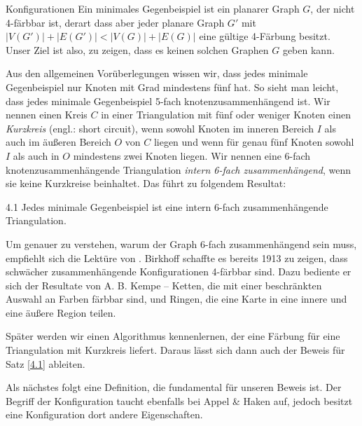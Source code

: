 \begin{section}{Konfigurationen}
 Ein minimales Gegenbeispiel ist ein planarer Graph $G$, der nicht 4-färbbar ist, derart dass aber jeder planare Graph $G'$ mit $|V(G')| + |E(G')| < |V(G)| + |E(G)|$ eine gültige 4-Färbung besitzt. Unser Ziel ist also, zu zeigen, dass es keinen solchen Graphen $G$ geben kann. 
   
 Aus den allgemeinen Vorüberlegungen wissen wir, dass jedes minimale Gegenbeispiel nur Knoten mit Grad mindestens fünf hat. So sieht man leicht, dass jedes minimale Gegenbeispiel 5-fach knotenzusammenhängend ist. Wir nennen einen Kreis $C$ in einer Triangulation mit fünf oder weniger Knoten einen \textit{Kurzkreis} (engl.: short circuit), wenn sowohl Knoten im inneren Bereich $I$ als auch im äußeren Bereich $O$ von $C$ liegen und wenn für genau fünf Knoten sowohl $I$ als auch in $O$ mindestens zwei Knoten liegen. Wir nennen eine 6-fach knotenzusammenhängende Triangulation \textit{intern 6-fach zusammenhängend}, wenn sie keine Kurzkreise beinhaltet. Das führt zu folgendem Resultat:
  
 \begin{satzl}{}{4.1}
  Jedes minimale Gegenbeispiel ist eine intern 6-fach zusammenhängende Triangulation. 
 \end{satzl}

 Um genauer zu verstehen, warum der Graph 6-fach zusammenhängend sein muss, empfiehlt sich die Lektüre von \cite{AmJMath35}. Birkhoff schaffte es bereits 1913 zu zeigen, dass schwächer zusammenhängende Konfigurationen 4-färbbar sind. Dazu bediente er sich der Resultate von A. B. Kempe -- Ketten, die mit einer beschränkten Auswahl an Farben färbbar sind, und Ringen, die eine Karte in eine innere und eine äußere Region teilen. 
 
 Später werden wir einen Algorithmus kennenlernen, der eine Färbung für eine Triangulation mit Kurzkreis liefert. Daraus lässt sich dann auch der Beweis für Satz \ref{4.1} ableiten.
 
 Als nächstes folgt eine Definition, die fundamental für unseren Beweis ist. Der Begriff der Konfiguration taucht ebenfalls bei Appel \& Haken auf, jedoch besitzt eine Konfiguration dort andere Eigenschaften.
  

\end{section}
